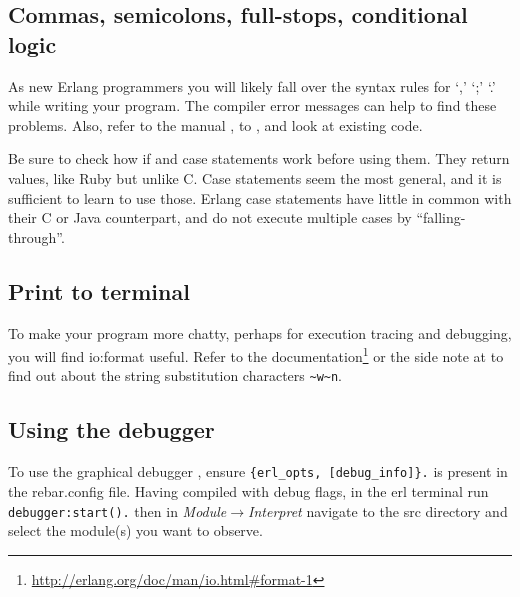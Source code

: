 \documentclass[a4paper]{article}
\begin{document}

\subsection{Commas, semicolons, full-stops, conditional logic} %
\label{sub:commas_semicolons_full_stops}

As new Erlang programmers you will likely fall over the syntax rules for `,'
`;' `.' while writing your program. The compiler error messages can help to
find these problems. Also, refer to the manual \cite{manual_functions}, to
\cite{lyse_function_syntax}, and look at existing code.

Be sure to check how if and case statements work before using them. They
return values, like Ruby but unlike C. Case statements seem the most general,
and it is sufficient to learn to use those. Erlang case statements have little
in common with their C or Java counterpart, and do not execute multiple
cases by ``falling-through''.


\subsection{Print to terminal} %
\label{sub:debug_printing}

To make your program more chatty, perhaps for execution tracing and debugging,
you will find io:format useful. Refer to
the documentation\footnote{\url{http://erlang.org/doc/man/io.html\#format-1}}
or the side note at \cite{lyse_function_syntax} to
find out about the string substitution characters \verb!~w~n!.


\subsection{Using the debugger} %
\label{sub:using_the_debugger}

To use the graphical debugger \cite{manual_debugger}, ensure
\verb!{erl_opts, [debug_info]}.! is present in the rebar.config file.
Having compiled with debug flags, in the erl terminal run \verb!debugger:start().!
then in \emph{Module$\rightarrow$Interpret} navigate to the src directory and select the
module(s) you want to observe.

\end{document}
